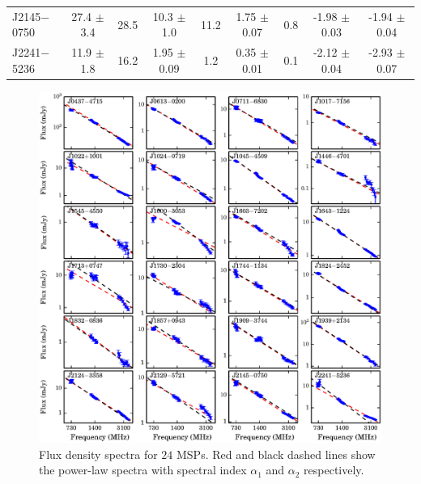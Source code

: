\documentclass[useAMS,usenatbib]{mn2e}
\begin{document}
\begin{table}
\begin{tabular}{lcccccccc}
 J2145$-$0750  &  27.4  $\pm$ 3.4  &  28.5  &  10.3  $\pm$ 1.0  &  11.2 &  1.75 $\pm$ 0.07 &  0.8   &  -1.98 $\pm$ 0.03 &  -1.94 $\pm$ 0.04 \\ 
 J2241$-$5236  &  11.9  $\pm$ 1.8  &  16.2  &  1.95  $\pm$ 0.09 &  1.2  &  0.35 $\pm$ 0.01 &  0.1   &  -2.12 $\pm$ 0.04 &  -2.93 $\pm$ 0.07 \\ 
\hline
\end{tabular}
\end{table}

\begin{figure}
\begin{center}
\includegraphics[width=6 in]{specIndex.ps}
\caption{Flux density spectra for $24$ MSPs. Red and black dashed lines show the power-law 
spectra with spectral index $\alpha_1$ and $\alpha_2$ respectively.} 
\label{index}
\end{center}
\end{figure}
\end{document}
